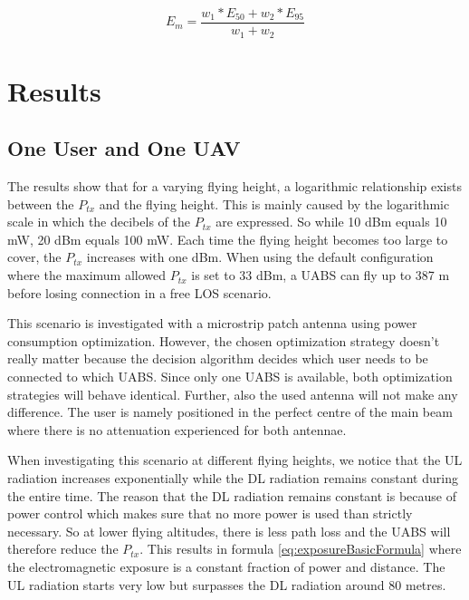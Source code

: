 \documentclass[twocolumn]{phdsymp} %
\begin{document}
\begin{equation} 
E_m = \frac{w_1 * E_{50} + w_2 * E_{95}}{w_1 + w_2}
\label{eq:em}
\end{equation}




\section{Results}
\subsection{One User and One \gls{UAV}}

The  results show that for a varying flying height, a logarithmic relationship exists between the $P_{tx}$ and the flying height. 
This is mainly caused by the logarithmic 
scale in which the decibels of the $P_{tx}$ are expressed. So while 10 dBm equals 10 mW, 20 dBm equals 100 mW. 
Each time the flying height becomes too large to cover, the 
$P_{tx}$ increases with one dBm. 
When using the default configuration where the maximum allowed $P_{tx}$ is set to 33 dBm,
a \gls{UABS} can fly up to 387 m before losing connection in a free \gls{LOS} scenario.

This scenario is investigated with a microstrip patch antenna using power consumption optimization. 
 However, the chosen optimization strategy doesn't really matter because the decision 
 algorithm decides which user 
needs to be connected to which \gls{UABS}. Since only one \gls{UABS} is available, both optimization strategies will behave identical.
Further, also the used antenna will not make any difference.
The user is namely positioned in the perfect centre of the main beam where there is 
no attenuation experienced for both antennae.

When investigating this scenario at different flying heights, we notice 
that the \gls{UL} radiation 
increases exponentially while 
the \gls{DL} radiation remains constant during the entire time. The reason that the \gls{DL} radiation
remains constant is because of power control which makes sure that no more power is used than strictly necessary. 
So at lower flying altitudes, there is less path loss and the \gls{UABS} 
will therefore reduce the $P_{tx}$. This results in formula \ref{eq:exposureBasicFormula} where the electromagnetic exposure is a constant fraction of power and distance.
The \gls{UL} radiation starts very low but surpasses the \gls{DL} radiation 
around 80 metres.
\end{document}
